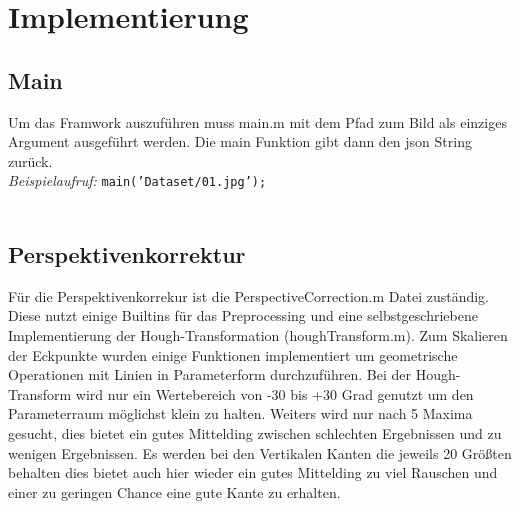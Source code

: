 \documentclass[paper=A4, deutsch]{scrartcl}
\begin{document}

\section{Implementierung}
\subsection{Main}
Um das Framwork auszuführen muss main.m mit dem Pfad zum Bild als einziges Argument ausgeführt werden. Die main Funktion gibt dann den json String zurück.\\
\textit{Beispielaufruf:} \texttt{main('Dataset/01.jpg');}\\
\\
\subsection{Perspektivenkorrektur}
Für die Perspektivenkorrekur ist die PerspectiveCorrection.m Datei zuständig. Diese nutzt einige Builtins für das Preprocessing und eine selbstgeschriebene Implementierung der Hough-Transformation (houghTransform.m). Zum Skalieren der Eckpunkte wurden einige Funktionen implementiert um geometrische Operationen mit Linien in Parameterform durchzuführen. Bei der Hough-Transform wird nur ein Wertebereich von -30 bis +30 Grad genutzt um den Parameterraum möglichst klein zu halten. Weiters wird nur nach 5 Maxima gesucht, dies bietet ein gutes Mittelding zwischen schlechten Ergebnissen und zu wenigen Ergebnissen. Es werden bei den Vertikalen Kanten die jeweils 20 Größten behalten dies bietet auch hier wieder ein gutes Mittelding zu viel Rauschen und einer zu geringen Chance eine gute Kante zu erhalten.\\
\\
\end{document}
